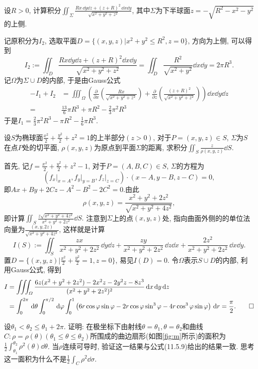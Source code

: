 \begin{quiza}
\begin{solution}
\end{solution}
\woe 设\(R>0\), 计算积分\(\iint_{\varSigma}\frac{Rx\,\dd y\dd z+(z+R)^2\,\dd x\dd y}{\sqrt{x^2+y^2+z^2}}\), 其中\(\varSigma\)为下半球面\(z=-\sqrt{R^2-x^2-y^2}\)的上侧.
\begin{solution}
记原积分为\(I_2\), 选取平面\(D=\{(x,y,z)\big|x^2+y^2\leqslant R^2,z=0\}\), 方向为上侧, 可以得到\[I_2:=\iint_{D}\frac{Rx\dd y\dd z+(z+R)^2\dd x\dd y}{\sqrt{x^2+y^2+z^2}}=\iint_{D}\frac{R^2}{\sqrt{x^2+y^2}}\dd x\dd y=2\pi R^3.\]记\(\varOmega\)为\(\varSigma\cup D\)的内部, 于是由Gauss公式\[\begin{split}
-I_1+I_2&=\iiint_{\varOmega}\left(\frac{\partial}{\partial x}\left(\frac{Rx}{\sqrt{x^2+y^2+z^2}}\right)+\frac{\partial}{\partial z}\left(\frac{(z+R)^2}{\sqrt{x^2+y^2+z^2}}\right)\right)\dd x\dd y\dd z\\
=&\frac{13}{6}\pi R^3+\pi R^2-\frac{2}{3}\pi^2R^3
\end{split}\]于是\(I_1=\frac{2}{3}\pi^2R^3-\pi R^2-\frac{1}{6}\pi R^3.\)
\end{solution}
\woe 设\(S\)为椭球面\(\frac{x^2}{2}+\frac{y^2}{2}+z^2=1\)的上半部分\((z>0)\), 对于\(P=(x,y,z)\in S\), \(\varSigma\)为\(S\)在点\(P\)处的切平面, \(\rho(x,y,z)\)为原点到平面\(\varSigma\)的距离, 求积分\(\iint_{S}\frac{z}{\rho(x,y,z)}\dd S\).
\begin{solution}
首先, 记\(f=\frac{x^2}{2}+\frac{y^2}{2}+z^2-1\), 对于\(P=(A,B,C)\in S\), \(\varSigma\)的方程为\[\left(f_x\big|_{x=A},f_y\big|_{y=B},f_z\big|_ {z=C}\right)\cdot (x-A,y-B,z-C)=0,\]即\(Ax+By+2Cz-A^2-B^2-2C^2=0.\)由此\[\rho(x,y,z)=\frac{x^2+y^2+2z^2}{\sqrt{x^2+y^2+4z^2}},\]即计算\(\iint_{S}\frac{z\sqrt{x^2+y^2+4z^2}}{x^2+y^2+2z^2}\dd S.\) 注意到\(\varSigma\)上的点\((x,y,z)\)处, 指向曲面外侧的的单位法向量为\(\frac{(x,y,2z)}{\sqrt{x^2+y^2+4z^2}}\), 这样就是计算\[I(S):=\iint_{S}\frac{zx}{x^2+y^2+2z^2}\,\dd y\dd z+\frac{zy}{x^2+y^2+2z^2}\,\dd z\dd x+\frac{2z^2}{x^2+y^2+2z^2}\,\dd x\dd y.\]置\(D=\{(x,y,z)\big| \frac{x^2}{2}+\frac{y^2}{2}=1,z=0\}\), 易见\(I(D)=0\). 令\(\varOmega\)表示\(S\cup D\)的内部, 利用Gauss公式, 得到\[\begin{split}
I&=\iiint_{\varOmega}\frac{6z(x^2+y^2+2z^2)-2x^2z-2y^2z-8z^3}{(x^2+y^2+2z^2)^2}\,\mathrm{d} x\,\mathrm{d} y\,\mathrm{d} z\\&=\int_{0}^{2\pi}\,\mathrm{d}\theta\int_{0}^{\pi/2}\,\mathrm{d}\varphi\int_{0}^{1}\left(6r\cos\varphi\sin\varphi-2r\cos\varphi\sin^3\varphi-4r\cos^3\varphi\sin\varphi\right)\,\mathrm{d} r=\frac{\pi}{2}.\qedhere
\end{split}\]
\end{solution}
\woe 设\(\theta_1<\theta_2\leqslant\theta_1+2\pi\). 证明: 在极坐标下由射线\(\theta=\theta_1,\theta=\theta_2\)和曲线\(C:\rho=\rho(\theta)(\theta_1\leqslant \theta\leqslant\theta_2)\)所围成的曲边扇形(如图\ref{fig:m}所示)的面积为\(\frac{1}{2}\int_{\theta_1}^{\theta_2}\rho^2\left(\theta\right)\dd\theta\). 当\(\rho\)连续可导时, 验证这一结果与公式(11.5.9)给出的结果一致. 思考这一面积为什么不是\(\frac{1}{2}\int_C\rho^2\dd\sigma\).

\end{quiza}

